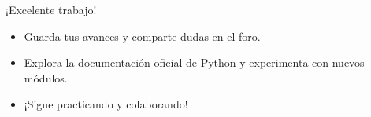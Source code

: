 \documentclass[10pt]{beamer}
\begin{document}
\begin{frame}
  \huge{\centerline{¡Excelente trabajo!}}
  \vspace{0.5cm}
  \normalsize
  \begin{itemize}
    \item Guarda tus avances y comparte dudas en el foro.
    \item Explora la documentación oficial de Python y experimenta con nuevos módulos.
    \item ¡Sigue practicando y colaborando!
  \end{itemize}
\end{frame}
\end{document}
